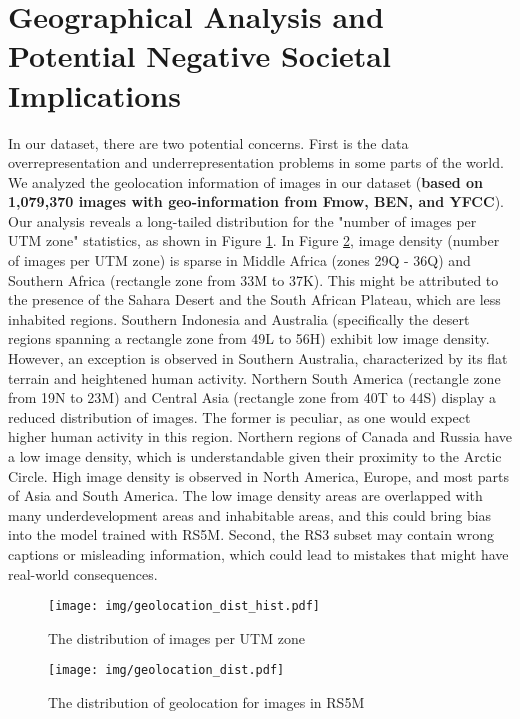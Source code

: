 \documentclass[journal]{IEEEtran}
\begin{document}
\section{Geographical Analysis and Potential Negative Societal Implications}
In our dataset, there are two potential concerns. First is the data overrepresentation and underrepresentation problems in some parts of the world. We analyzed the geolocation information of images in our dataset (\textbf{based on 1,079,370 images with geo-information from Fmow, BEN, and YFCC}). Our analysis reveals a long-tailed distribution for the "number of images per UTM zone" statistics, as shown in Figure \ref{fig:geolocation_dist_hist}. In Figure \ref{fig:geolocation_dist}, image density (number of images per UTM zone) is sparse in Middle Africa (zones 29Q - 36Q) and Southern Africa (rectangle zone from 33M to 37K). This might be attributed to the presence of the Sahara Desert and the South African Plateau, which are less inhabited regions. Southern Indonesia and Australia (specifically the desert regions spanning a rectangle zone from 49L to 56H) exhibit low image density. However, an exception is observed in Southern Australia, characterized by its flat terrain and heightened human activity. Northern South America (rectangle zone from 19N to 23M) and Central Asia (rectangle zone from 40T to 44S) display a reduced distribution of images. The former is peculiar, as one would expect higher human activity in this region. Northern regions of Canada and Russia have a low image density, which is understandable given their proximity to the Arctic Circle. High image density is observed in North America, Europe, and most parts of Asia and South America. The low image density areas are overlapped with many underdevelopment areas and inhabitable areas, and this could bring bias into the model trained with RS5M. Second, the RS3 subset may contain wrong captions or misleading information, which could lead to mistakes that might have real-world consequences. 

\begin{figure}
    \centering
    \texttt{[image: img/geolocation\_dist\_hist.pdf]}
    \caption{The distribution of images per UTM zone}
    \label{fig:geolocation_dist_hist}
\end{figure}


\begin{figure}
    \centering
    \texttt{[image: img/geolocation\_dist.pdf]}
    \caption{The distribution of geolocation for images in RS5M}
    \label{fig:geolocation_dist}
\end{figure}
\end{document}
